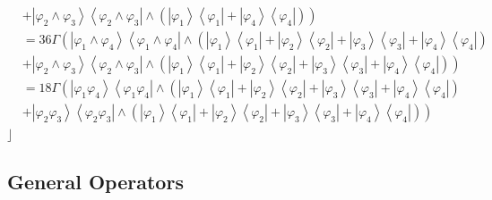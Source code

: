 \documentclass[aps,preprint]{revtex4}%
\begin{document}
\begin{align*}
\\
&  \left.  +\left\vert \varphi_{2}\wedge\varphi_{3}\right\rangle \left\langle
\varphi_{2}\wedge\varphi_{3}\right\vert \wedge\left(  \left\vert \varphi
_{1}\right\rangle \left\langle \varphi_{1}\right\vert +\left\vert \varphi
_{4}\right\rangle \left\langle \varphi_{4}\right\vert \right)  \right) \\
&  =36\Gamma\left(  \left\vert \varphi_{1}\wedge\varphi_{4}\right\rangle
\left\langle \varphi_{1}\wedge\varphi_{4}\right\vert \wedge\left(  \left\vert
\varphi_{1}\right\rangle \left\langle \varphi_{1}\right\vert +\left\vert
\varphi_{2}\right\rangle \left\langle \varphi_{2}\right\vert +\left\vert
\varphi_{3}\right\rangle \left\langle \varphi_{3}\right\vert +\left\vert
\varphi_{4}\right\rangle \left\langle \varphi_{4}\right\vert \right)  \right.
\\
&  \left.  +\left\vert \varphi_{2}\wedge\varphi_{3}\right\rangle \left\langle
\varphi_{2}\wedge\varphi_{3}\right\vert \wedge\left(  \left\vert \varphi
_{1}\right\rangle \left\langle \varphi_{1}\right\vert +\left\vert \varphi
_{2}\right\rangle \left\langle \varphi_{2}\right\vert +\left\vert \varphi
_{3}\right\rangle \left\langle \varphi_{3}\right\vert +\left\vert \varphi
_{4}\right\rangle \left\langle \varphi_{4}\right\vert \right)  \right) \\
&  =18\Gamma\left(  \left\vert \varphi_{1}\varphi_{4}\right\rangle
\left\langle \varphi_{1}\varphi_{4}\right\vert \wedge\left(  \left\vert
\varphi_{1}\right\rangle \left\langle \varphi_{1}\right\vert +\left\vert
\varphi_{2}\right\rangle \left\langle \varphi_{2}\right\vert +\left\vert
\varphi_{3}\right\rangle \left\langle \varphi_{3}\right\vert +\left\vert
\varphi_{4}\right\rangle \left\langle \varphi_{4}\right\vert \right)  \right.
\\
&  \left.  +\left\vert \varphi_{2}\varphi_{3}\right\rangle \left\langle
\varphi_{2}\varphi_{3}\right\vert \wedge\left(  \left\vert \varphi
_{1}\right\rangle \left\langle \varphi_{1}\right\vert +\left\vert \varphi
_{2}\right\rangle \left\langle \varphi_{2}\right\vert +\left\vert \varphi
_{3}\right\rangle \left\langle \varphi_{3}\right\vert +\left\vert \varphi
_{4}\right\rangle \left\langle \varphi_{4}\right\vert \right)  \right)
\end{align*}
$\rfloor$

\subsection{General Operators}
\end{document}
